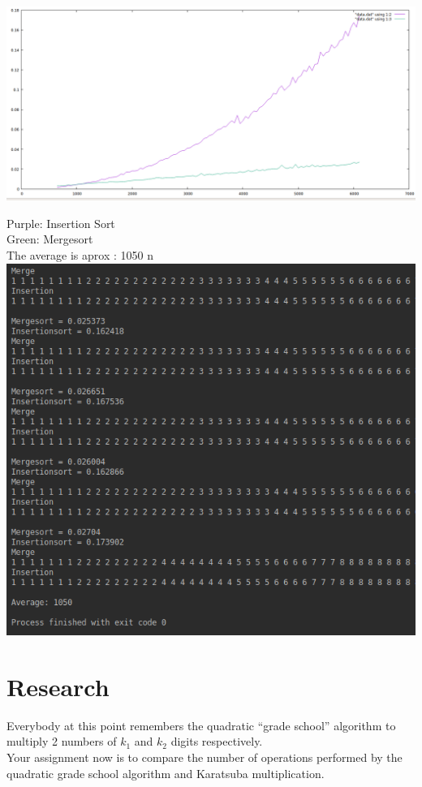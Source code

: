 \documentclass[12pt]{article}
\begin{document}
\includegraphics[width=\textwidth]{Src/Gnuplot.png}


Purple: Insertion Sort\\
Green: Mergesort\\

The average is aprox : 1050 n\\
\includegraphics[width=\textwidth]{Src/Average.png}
\section{Research}

Everybody at this point remembers the quadratic ``grade school'' algorithm to multiply 2 numbers of $k_{1}$ and $k_{2}$ digits respectively. \\

Your assignment now is to compare the number of operations performed by the quadratic grade school algorithm and Karatsuba multiplication.
\end{document}
